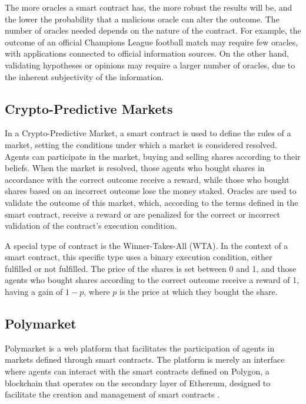 The more oracles a smart contract has, the more robust the results will be, and the lower the probability that a malicious oracle can alter the outcome. The number of oracles needed depends on the nature of the contract. For example, the outcome of an official Champions League football match may require few oracles, with applications connected to official information sources. On the other hand, validating hypotheses or opinions may require a larger number of oracles, due to the inherent subjectivity of the information.

\subsection{Crypto-Predictive Markets}
\label{subsec:crypto_predictive_markets}

In a Crypto-Predictive Market, a smart contract is used to define the rules of a market, setting the conditions under which a market is considered resolved. Agents can participate in the market, buying and selling shares according to their beliefs. When the market is resolved, those agents who bought shares in accordance with the correct outcome receive a reward, while those who bought shares based on an incorrect outcome lose the money staked. Oracles are used to validate the outcome of this market, which, according to the terms defined in the smart contract, receive a reward or are penalized for the correct or incorrect validation of the contract's execution condition.
    
A special type of contract is the Winner-Takes-All (WTA). In the context of a smart contract, this specific type uses a binary execution condition, either fulfilled or not fulfilled. The price of the shares is set between 0 and 1, and those agents who bought shares according to the correct outcome receive a reward of 1, having a gain of $1-p$, where $p$ is the price at which they bought the share.

\subsection{Polymarket}
\label{subsec:polymarket}

Polymarket is a web platform that facilitates the participation of agents in markets defined through smart contracts. The platform is merely an interface where agents can interact with the smart contracts defined on Polygon, a blockchain that operates on the secondary layer of Ethereum, designed to facilitate the creation and management of smart contracts \parencite{PolymarketLearn}.

